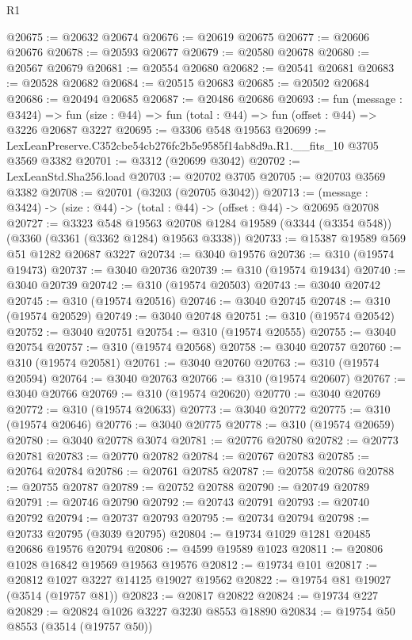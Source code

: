 \begin{lexlean}{R1}
\begin{coremodule}
@20675 := @20632 @20674
@20676 := @20619 @20675
@20677 := @20606 @20676
@20678 := @20593 @20677
@20679 := @20580 @20678
@20680 := @20567 @20679
@20681 := @20554 @20680
@20682 := @20541 @20681
@20683 := @20528 @20682
@20684 := @20515 @20683
@20685 := @20502 @20684
@20686 := @20494 @20685
@20687 := @20486 @20686
@20693 := fun (message : @3424) =>
  fun (size : @44) => fun (total : @44) => fun (offset : @44) => @3226 @20687 @3227
@20695 := @3306 @548 @19563
@20699 := LexLeanPreserve.C352cbe54cb276fc2b5e9585f14ab8d9a.R1.__fits_10 @3705 @3569 @3382
@20701 := @3312 (@20699 @3042)
@20702 := LexLeanStd.Sha256.load
@20703 := @20702 @3705
@20705 := @20703 @3569 @3382
@20708 := @20701 (@3203 (@20705 @3042))
@20713 := (message : @3424) -> (size : @44) -> (total : @44) -> (offset : @44) -> @20695 @20708
@20727 := @3323
    @548
    @19563
    @20708
    @1284
    @19589
    (@3344 (@3354 @548))
    (@3360 (@3361 (@3362 @1284) @19563 @3338))
@20733 := @15387 @19589 @569 @51 @1282 @20687 @3227
@20734 := @3040 @19576
@20736 := @310 (@19574 @19473)
@20737 := @3040 @20736
@20739 := @310 (@19574 @19434)
@20740 := @3040 @20739
@20742 := @310 (@19574 @20503)
@20743 := @3040 @20742
@20745 := @310 (@19574 @20516)
@20746 := @3040 @20745
@20748 := @310 (@19574 @20529)
@20749 := @3040 @20748
@20751 := @310 (@19574 @20542)
@20752 := @3040 @20751
@20754 := @310 (@19574 @20555)
@20755 := @3040 @20754
@20757 := @310 (@19574 @20568)
@20758 := @3040 @20757
@20760 := @310 (@19574 @20581)
@20761 := @3040 @20760
@20763 := @310 (@19574 @20594)
@20764 := @3040 @20763
@20766 := @310 (@19574 @20607)
@20767 := @3040 @20766
@20769 := @310 (@19574 @20620)
@20770 := @3040 @20769
@20772 := @310 (@19574 @20633)
@20773 := @3040 @20772
@20775 := @310 (@19574 @20646)
@20776 := @3040 @20775
@20778 := @310 (@19574 @20659)
@20780 := @3040 @20778 @3074
@20781 := @20776 @20780
@20782 := @20773 @20781
@20783 := @20770 @20782
@20784 := @20767 @20783
@20785 := @20764 @20784
@20786 := @20761 @20785
@20787 := @20758 @20786
@20788 := @20755 @20787
@20789 := @20752 @20788
@20790 := @20749 @20789
@20791 := @20746 @20790
@20792 := @20743 @20791
@20793 := @20740 @20792
@20794 := @20737 @20793
@20795 := @20734 @20794
@20798 := @20733 @20795 (@3039 @20795)
@20804 := @19734 @1029 @1281 @20485 @20686 @19576 @20794
@20806 := @4599 @19589 @1023
@20811 := @20806 @1028 @16842 @19569 @19563 @19576
@20812 := @19734 @101
@20817 := @20812 @1027 @3227 @14125 @19027 @19562
@20822 := @19754 @81 @19027 (@3514 (@19757 @81))
@20823 := @20817 @20822
@20824 := @19734 @227
@20829 := @20824 @1026 @3227 @3230 @8553 @18890
@20834 := @19754 @50 @8553 (@3514 (@19757 @50))

\end{coremodule}
\end{lexlean}
